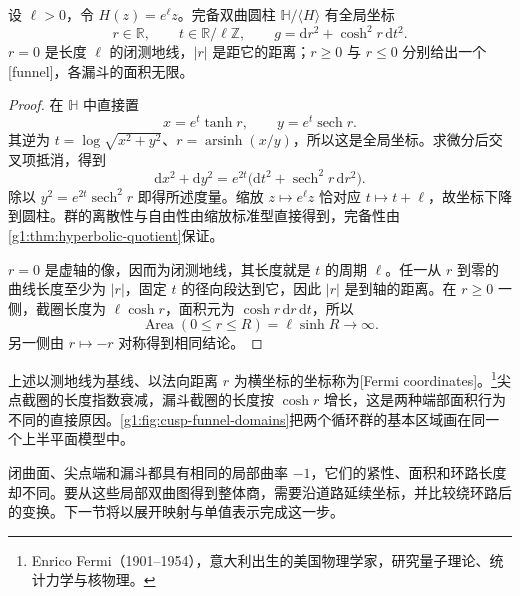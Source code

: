 \begin{proposition}\label{g1:prop:hyperbolic-cylinder-fermi}
	设 \(\ell>0\)，令 \(H(z)=e^\ell z\)。完备双曲圆柱 \(\mathbb H/\langle H\rangle\) 有全局坐标
	\[
		r\in\mathbb R,\qquad t\in\mathbb R/\ell\mathbb Z,
		\qquad g=\mathrm{d}r^2+\cosh^2r\,\mathrm{d}t^2.
	\]
	\(r=0\) 是长度 \(\ell\) 的闭测地线，\(|r|\) 是距它的距离；\(r\ge0\) 与 \(r\le0\) 分别给出一个[funnel]，各漏斗的面积无限。
\end{proposition}
\begin{proof}
	在 \(\mathbb H\) 中直接置
	\[
		x=e^t\tanh r,\qquad y=e^t\operatorname{sech}r.
	\]
	其逆为 \(t=\log\sqrt{x^2+y^2}\)、\(r=\operatorname{arsinh}(x/y)\)，所以这是全局坐标。求微分后交叉项抵消，得到
	\[
		\mathrm{d}x^2+\mathrm{d}y^2
		=e^{2t}\bigl(\mathrm{d}t^2+\operatorname{sech}^2r\,\mathrm{d}r^2\bigr).
	\]
	除以 \(y^2=e^{2t}\operatorname{sech}^2r\) 即得所述度量。缩放 \(z\mapsto e^\ell z\) 恰对应 \(t\mapsto t+\ell\)，故坐标下降到圆柱。群的离散性与自由性由缩放标准型直接得到，完备性由\cref{g1:thm:hyperbolic-quotient}保证。

	\(r=0\) 是虚轴的像，因而为闭测地线，其长度就是 \(t\) 的周期 \(\ell\)。任一从 \(r\) 到零的曲线长度至少为 \(|r|\)，固定 \(t\) 的径向段达到它，因此 \(|r|\) 是到轴的距离。在 \(r\ge0\) 一侧，截圈长度为 \(\ell\cosh r\)，面积元为 \(\cosh r\,\mathrm{d}r\,\mathrm{d}t\)，所以
	\[
		\operatorname{Area}(0\le r\le R)=\ell\sinh R\longrightarrow\infty.
	\]
	另一侧由 \(r\mapsto-r\) 对称得到相同结论。
\end{proof}

上述以测地线为基线、以法向距离 \(r\) 为横坐标的坐标称为[Fermi coordinates]。\footnote{Enrico Fermi（1901--1954），意大利出生的美国物理学家，研究量子理论、统计力学与核物理。}尖点截圈的长度指数衰减，漏斗截圈的长度按 \(\cosh r\) 增长，这是两种端部面积行为不同的直接原因。\cref{g1:fig:cusp-funnel-domains}把两个循环群的基本区域画在同一个上半平面模型中。



闭曲面、尖点端和漏斗都具有相同的局部曲率 \(-1\)，它们的紧性、面积和环路长度却不同。要从这些局部双曲图得到整体商，需要沿道路延续坐标，并比较绕环路后的变换。下一节将以展开映射与单值表示完成这一步。

